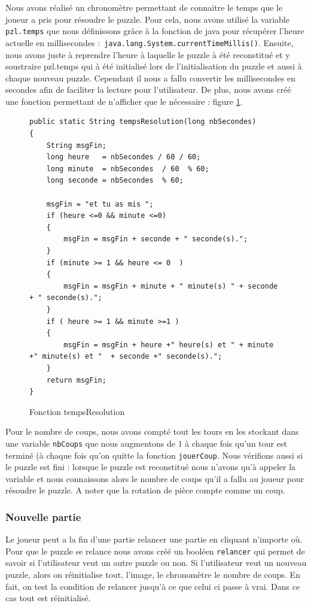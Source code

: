 \documentclass[]{article}
\newcommand{\variable}[1]{\noindent \texttt{#1}}
\begin{document}
Nous avons réalisé un chronomètre permettant de connaitre le temps que le joueur a pris pour résoudre le puzzle. 
Pour cela, nous avons utilisé la variable \variable{pzl.temps} que nous définissons grâce à la fonction de java pour récupérer l'heure actuelle en millisecondes :\variable{ java.lang.System.currentTimeMillis()}. 
Ensuite, nous avons juste à reprendre l'heure à laquelle le puzzle à été reconstitué et y soustraire pzl.temps qui à été initialisé lors de l'initialisation du puzzle et aussi à chaque nouveau puzzle.
Cependant il nous a fallu convertir les millisecondes en secondes afin de faciliter la lecture pour l'utilisateur. De plus, nous avons créé une fonction permettant de n'afficher que le nécessaire : figure \no\ref{Fonction tempsResolution}.

\begin{figure}[hpt]
	\center
	\caption{\label{Fonction tempsResolution} Fonction tempsResolution}
\begin{lstlisting}
public static String tempsResolution(long nbSecondes)
{
    String msgFin;
    long heure   = nbSecondes / 60 / 60;
    long minute  = nbSecondes  / 60  % 60;
    long seconde = nbSecondes  % 60;

    msgFin = "et tu as mis ";
    if (heure <=0 && minute <=0)
    {
        msgFin = msgFin + seconde + " seconde(s).";
    }
    if (minute >= 1 && heure <= 0  )
    {
        msgFin = msgFin + minute + " minute(s) " + seconde + " seconde(s).";
    }
    if ( heure >= 1 && minute >=1 )
    {
        msgFin = msgFin + heure +" heure(s) et " + minute +" minute(s) et "  + seconde +" seconde(s).";
    }
    return msgFin;
}
\end{lstlisting}
\end{figure}

Pour le nombre de coups, nous avons compté tout les tours en les stockant dans une variable \variable{nbCoups} que nous augmentons de 1 à chaque fois qu'un tour est terminé (à chaque fois qu'on quitte la fonction \variable{jouerCoup}. Nous vérifions aussi si le puzzle est fini : lorsque le puzzle est reconstitué nous n'avons qu'à appeler la variable et nous connaissons alors le nombre de coups qu'il a fallu au joueur pour résoudre le puzzle. A noter que la rotation de pièce compte comme un coup.

\subsubsection{Nouvelle partie}

Le joueur peut a la fin d'une partie relancer une partie en cliquant n'importe où. Pour que le puzzle se relance nous avons créé un booléen \variable{relancer} qui permet de savoir si l'utilisateur veut un autre puzzle ou non. Si l'utilisateur veut un nouveau puzzle, alors on réinitialise tout, l'image, le chronomètre le nombre de coups. En fait, on test la condition de relancer jusqu'à ce que celui ci passe à vrai. Dans ce cas tout est réinitialisé. 
\end{document}
